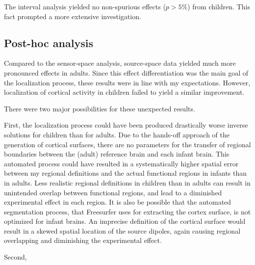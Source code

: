 The interval analysis yielded no non-spurious effects ($p > 5\%$) from children.
This fact prompted a more extensive investigation.

\subsection{Post-hoc analysis}

Compared to the sensor-space analysis, source-space data yielded much more pronounced effects in adults.
Since this effect differentiation was the main goal of the localization process, these results were in line with my expectations.
However, localization of cortical activity in children failed to yield a similar improvement.

There were two major possibilities for these unexpected results.

First, the localization process could have been produced drastically worse inverse solutions for children than for adults.
Due to the hands-off approach of the generation of cortical surfaces, there are no parameters for the transfer of regional boundaries between the (adult) reference brain and each infant brain.
This automated process could have resulted in a systematically higher spatial error between my regional definitions and the actual functional regions in infants than in adults.
Less realistic regional definitions in children than in adults can result in unintended overlap between functional regions, and lead to a diminished experimental effect in each region.
It is also be possible that the automated segmentation process, that Freesurfer uses for extracting the cortex surface, is not optimized for infant brains.
An imprecise definition of the cortical surface would result in a skewed spatial location of the source dipoles, again causing regional overlapping and diminishing the experimental effect.

Second, 

